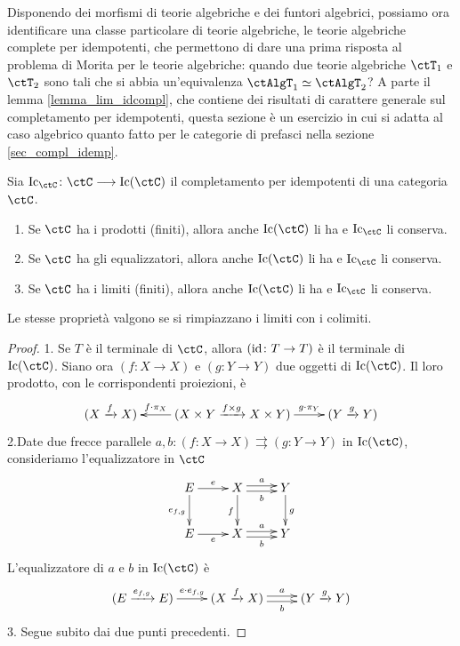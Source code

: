 Disponendo dei morfismi di teorie algebriche e dei funtori algebrici, possiamo ora identificare una classe particolare di
teorie algebriche, le teorie algebriche complete per idempotenti, che permettono di dare una prima risposta al problema
di Morita per le teorie algebriche: quando due teorie algebriche \(\ctT_1\) e \(\ctT_2\) sono tali che si abbia un'equivalenza
\(\ctAlgT_1 \simeq \ctAlgT_2\)? A parte il lemma \ref{lemma_lim_idcompl}, che contiene dei risultati di carattere generale sul
completamento per idempotenti, questa sezione è un esercizio in cui si adatta al caso algebrico quanto fatto per le categorie
di prefasci nella sezione \ref{sec_compl_idemp}.

\begin{lemma}\label{lemma_lim_idcompl}
 Sia \(\mathrm{Ic}_{\ctC} \colon \ctC \fun \mathrm{Ic}(\ctC)\) il completamento per idempotenti di una categoria \(\ctC\).
 \begin{enumerate}
  \item Se \(\ctC\) ha i prodotti (finiti), allora anche \(\mathrm{Ic}(\ctC)\) li ha e \(\mathrm{Ic}_{\ctC}\) li conserva.
  \item Se \(\ctC\) ha gli equalizzatori, allora anche \(\mathrm{Ic}(\ctC)\) li ha e \(\mathrm{Ic}_{\ctC}\) li conserva.
  \item Se \(\ctC\) ha i limiti (finiti), allora anche \(\mathrm{Ic}(\ctC)\) li ha e \(\mathrm{Ic}_{\ctC}\) li conserva.
 \end{enumerate}
 Le stesse proprietà valgono se si rimpiazzano i limiti con i colimiti.
\end{lemma}

\begin{proof}
 1. Se \(T\) è il terminale di \(\ctC\), allora \((\mathrm{id} \colon T \to T)\) è il terminale di \(\mathrm{Ic}(\ctC)\).
 Siano ora \((f \colon X \to X)\) e \((g \colon Y \to Y)\) due oggetti di \(\mathrm{Ic}(\ctC)\). Il loro prodotto, con le corrispondenti
 proiezioni, è
 \[ \xymatrix{ (X \xto{f} X) & (X \times Y \xto{f \times g} X \times Y) \ar[l]_-{f \cmp \pi_X} \ar[r]^-{g \cmp \pi_Y} & (Y \xto{g} Y) } \]
 2.Date due frecce parallele \(a,b \colon (f \colon X \to X) \rightrightarrows (g \colon Y \to Y)\) in \(\mathrm{Ic}(\ctC)\), consideriamo
 l'equalizzatore in \(\ctC\)
 \[ \xymatrix{ E \ar[d]_{e_{f,g}} \ar[r]^-{e} & X \ar@<0.5ex>[r]^-{a} \ar@<-0.5ex>[r]_-{b} \ar[d]_{f} & Y \ar[d]^{g} \\
  E \ar[r]_-{e} & X \ar@<0.5ex>[r]^-{a} \ar@<-0.5ex>[r]_-{b} & Y } \]
 L'equalizzatore di \(a\) e \(b\) in \(\mathrm{Ic}(\ctC)\) è
 \[ \xymatrix{ (E \xto{e_{f,g}} E) \ar[r]^-{e \cmp e_{f,g}} & (X \xto{f} X) \ar@<0.5ex>[r]^-{a} \ar@<-0.5ex>[r]_-{b} & (Y \xto{g} Y) } \]
 3. Segue subito dai due punti precedenti.
\end{proof}

